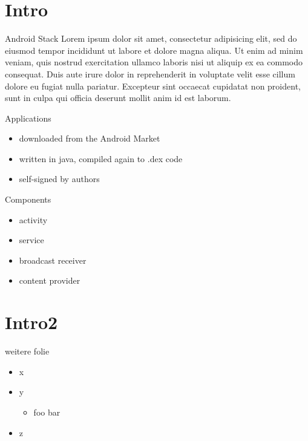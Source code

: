 \section{Intro}
\begin{frame}{Android Stack}
Lorem ipsum dolor sit amet, consectetur adipisicing elit, sed do eiusmod tempor incididunt ut labore et dolore magna aliqua. Ut enim ad minim veniam, quis nostrud exercitation ullamco laboris nisi ut aliquip ex ea commodo consequat. Duis aute irure dolor in reprehenderit in voluptate velit esse cillum dolore eu fugiat nulla pariatur. Excepteur sint occaecat cupidatat non proident, sunt in culpa qui officia deserunt mollit anim id est laborum.
\end{frame}

\begin{frame}{Applications}

		\begin{itemize}
			\item downloaded from the Android Market
			\item written in java, compiled again to .dex code
			\item self-signed by authors
		\end{itemize}
	
	\begin{block}{Components}
	\begin{itemize}
		\item activity
		\item service
		\item broadcast receiver
		\item content provider
	\end{itemize}
\end{block}
\end{frame}

\section{Intro2}
\begin{frame}{weitere folie}
	\begin{itemize}
		\item x
		\item y
			\begin{itemize}
				\item foo bar
			\end{itemize}
		\item z
	\end{itemize}
\end{frame}
